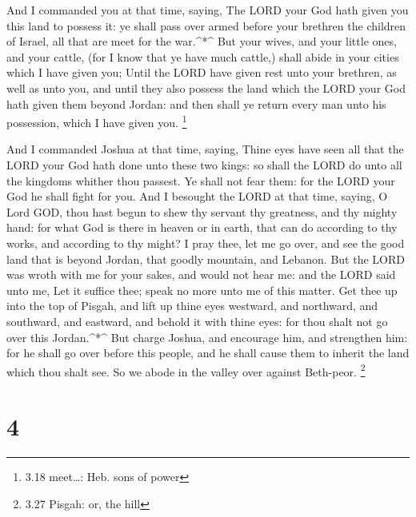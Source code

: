  And I commanded you at that time, saying, The LORD your
God hath given you this land to possess it: ye shall pass over armed
before your brethren the children of Israel, all that are meet for the
war.\^{}*\^{}  But your wives, and your little ones, and
your cattle, (for I know that ye have much cattle,) shall abide in your
cities which I have given you;  Until the LORD have given
rest unto your brethren, as well as unto you, and until they also
possess the land which the LORD your God hath given them beyond Jordan:
and then shall ye return every man unto his possession, which I have
given you. \footnote{3.18 meet\ldots: Heb. sons of power}

 And I commanded Joshua at that time, saying, Thine eyes
have seen all that the LORD your God hath done unto these two kings: so
shall the LORD do unto all the kingdoms whither thou passest.
 Ye shall not fear them: for the LORD your God he shall
fight for you.  And I besought the LORD at that time,
saying,  O Lord GOD, thou hast begun to shew thy servant
thy greatness, and thy mighty hand: for what God is there in heaven or
in earth, that can do according to thy works, and according to thy
might?  I pray thee, let me go over, and see the good land
that is beyond Jordan, that goodly mountain, and Lebanon. 
But the LORD was wroth with me for your sakes, and would not hear me:
and the LORD said unto me, Let it suffice thee; speak no more unto me of
this matter.  Get thee up into the top of Pisgah, and lift
up thine eyes westward, and northward, and southward, and eastward, and
behold it with thine eyes: for thou shalt not go over this
Jordan.\^{}*\^{}  But charge Joshua, and encourage him, and
strengthen him: for he shall go over before this people, and he shall
cause them to inherit the land which thou shalt see.  So we
abode in the valley over against Beth-peor. \footnote{3.27 Pisgah: or,
  the hill}

\hypertarget{section-3}{%
\section{4}\label{section-3}}

